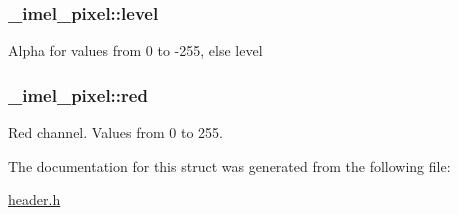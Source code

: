 \subsubsection[{\texorpdfstring{level}{level}}]{ \+\_\+imel\+\_\+pixel\+::level}\hypertarget{struct__imel__pixel_a729d8e2d9902ac1a6e2fbbc6f63cf1ed}{}\label{struct__imel__pixel_a729d8e2d9902ac1a6e2fbbc6f63cf1ed}
Alpha for values from 0 to -\/255, else level 
\subsubsection[{\texorpdfstring{red}{red}}]{ \+\_\+imel\+\_\+pixel\+::red}\hypertarget{struct__imel__pixel_af491601f44bd0b35d72b77f94940ec65}{}\label{struct__imel__pixel_af491601f44bd0b35d72b77f94940ec65}
Red channel. Values from 0 to 255. 

The documentation for this struct was generated from the following file\+:\begin{DoxyCompactItemize}
\item 
\hyperlink{header_8h}{header.\+h}\end{DoxyCompactItemize}
